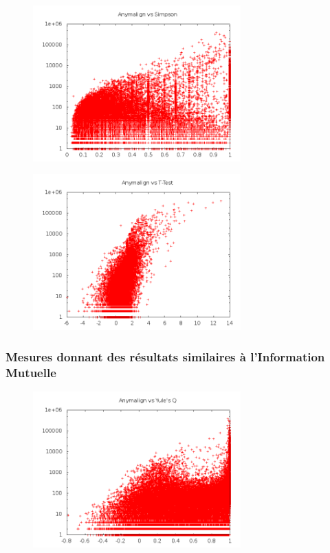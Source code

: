 \documentclass[a4paper,10pt]{article}
\begin{document}
\begin{figure}[!h]
\centering
\includegraphics[width=8cm]{simpsonlog.png}
\end{figure}

\begin{figure}[!h]
\centering
\includegraphics[width=8cm]{ttestlog.png}
\end{figure}


\subsubsection{Mesures donnant des résultats similaires à l'Information Mutuelle}
\label{commeim}

\begin{figure}[!h]
\centering
\includegraphics[width=8cm]{yuleqlog.png}
\end{figure}
\end{document}
